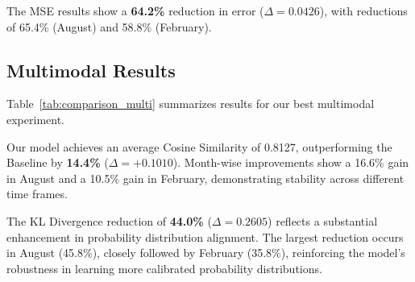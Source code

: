 The MSE results show a \textbf{64.2\%} reduction in error ($\Delta = 0.0426$), with reductions of 65.4\% (August) and 58.8\% (February).

\subsection{Multimodal Results}
\label{sec:multimodal-results}

Table~\ref{tab:comparison_multi} summarizes results for our best multimodal experiment.
\newline

\begin{table}[ht]
    \centering
    \caption{Performance comparison between Baseline and Our Model for multimodal experiments. The Baseline predictions are obtained by averaging the outputs from the two unimodal Baseline models. Higher values are better for $\uparrow$, and lower values are better for $\downarrow$. Bold values indicate averaged scores.}
    \label{tab:comparison_multi}
\end{table}

Our model achieves an average Cosine Similarity of 0.8127, outperforming the Baseline by \textbf{14.4\%} ($\Delta = +0.1010$). Month-wise improvements show a 16.6\% gain in August and a 10.5\% gain in February, demonstrating stability across different time frames. 
\newline

The KL Divergence reduction of \textbf{44.0\%} ($\Delta = 0.2605$) reflects a substantial enhancement in probability distribution alignment. The largest reduction occurs in August (45.8\%), closely followed by February (35.8\%), reinforcing the model's robustness in learning more calibrated probability distributions.
\newline

